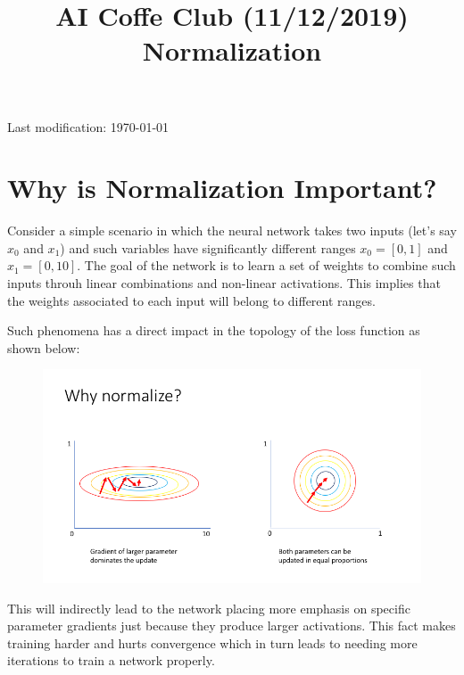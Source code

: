 \documentclass{article}
\begin{document}
\title{AI Coffe Club (11/12/2019)\\ Normalization}
\date{}

\maketitle

\begin{center}
Last modification: \today\\
\end{center}

\section{Why is Normalization Important?}

Consider a simple scenario in which the neural network takes two inputs (let's say $x_0$ and $x_1$) and such variables have significantly different ranges $x_0 = [0, 1]$ and $x_1 = [0, 10]$. The goal of the network is to learn a set of weights to combine such inputs throuh linear combinations and non-linear activations. This implies that the weights associated to each input will belong to different ranges.

Such phenomena has a direct impact in the topology of the loss function as shown below:

\begin{figure}[!htb]
  \centering
  \includegraphics[clip, trim=0 100 0 0, width=\linewidth]{normalization.png}
\end{figure}

This will indirectly lead to the network placing more emphasis on specific parameter gradients just because they produce larger activations. This fact makes training harder and hurts convergence which in turn leads to needing more iterations to train a network properly.
\end{document}
